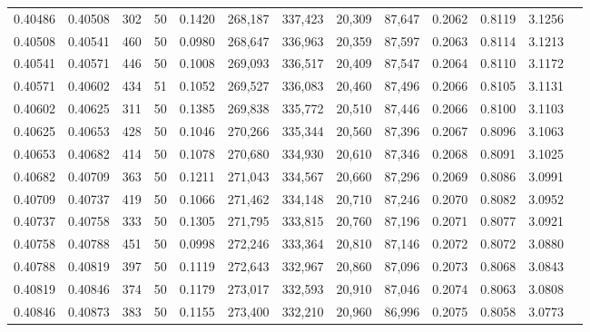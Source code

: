 \begin{tabular}{rrrrrrrrrrrrr}
0.40486 & 0.40508 &   302 &  50 &                                     0.1420 & 268,187 & 337,423 &  20,309 &  87,647 & 0.2062 & 0.8119 & 3.1256 \\
0.40508 & 0.40541 &   460 &  50 &                                     0.0980 & 268,647 & 336,963 &  20,359 &  87,597 & 0.2063 & 0.8114 & 3.1213 \\
0.40541 & 0.40571 &   446 &  50 &                                     0.1008 & 269,093 & 336,517 &  20,409 &  87,547 & 0.2064 & 0.8110 & 3.1172 \\
0.40571 & 0.40602 &   434 &  51 &                                     0.1052 & 269,527 & 336,083 &  20,460 &  87,496 & 0.2066 & 0.8105 & 3.1131 \\
0.40602 & 0.40625 &   311 &  50 &                                     0.1385 & 269,838 & 335,772 &  20,510 &  87,446 & 0.2066 & 0.8100 & 3.1103 \\
0.40625 & 0.40653 &   428 &  50 &                                     0.1046 & 270,266 & 335,344 &  20,560 &  87,396 & 0.2067 & 0.8096 & 3.1063 \\
0.40653 & 0.40682 &   414 &  50 &                                     0.1078 & 270,680 & 334,930 &  20,610 &  87,346 & 0.2068 & 0.8091 & 3.1025 \\
0.40682 & 0.40709 &   363 &  50 &                                     0.1211 & 271,043 & 334,567 &  20,660 &  87,296 & 0.2069 & 0.8086 & 3.0991 \\
0.40709 & 0.40737 &   419 &  50 &                                     0.1066 & 271,462 & 334,148 &  20,710 &  87,246 & 0.2070 & 0.8082 & 3.0952 \\
0.40737 & 0.40758 &   333 &  50 &                                     0.1305 & 271,795 & 333,815 &  20,760 &  87,196 & 0.2071 & 0.8077 & 3.0921 \\
0.40758 & 0.40788 &   451 &  50 &                                     0.0998 & 272,246 & 333,364 &  20,810 &  87,146 & 0.2072 & 0.8072 & 3.0880 \\
0.40788 & 0.40819 &   397 &  50 &                                     0.1119 & 272,643 & 332,967 &  20,860 &  87,096 & 0.2073 & 0.8068 & 3.0843 \\
0.40819 & 0.40846 &   374 &  50 &                                     0.1179 & 273,017 & 332,593 &  20,910 &  87,046 & 0.2074 & 0.8063 & 3.0808 \\
0.40846 & 0.40873 &   383 &  50 &                                     0.1155 & 273,400 & 332,210 &  20,960 &  86,996 & 0.2075 & 0.8058 & 3.0773 \\

\end{tabular}
